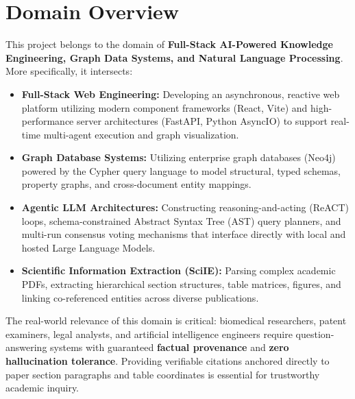 \section{Domain Overview}
This project belongs to the domain of \textbf{Full-Stack AI-Powered Knowledge Engineering, Graph Data Systems, and Natural Language Processing}. More specifically, it intersects:
\begin{itemize}
    \item \textbf{Full-Stack Web Engineering:} Developing an asynchronous, reactive web platform utilizing modern component frameworks (React, Vite) and high-performance server architectures (FastAPI, Python AsyncIO) to support real-time multi-agent execution and graph visualization.
    \item \textbf{Graph Database Systems:} Utilizing enterprise graph databases (Neo4j) powered by the Cypher query language to model structural, typed schemas, property graphs, and cross-document entity mappings.
    \item \textbf{Agentic LLM Architectures:} Constructing reasoning-and-acting (ReACT) loops, schema-constrained Abstract Syntax Tree (AST) query planners, and multi-run consensus voting mechanisms that interface directly with local and hosted Large Language Models.
    \item \textbf{Scientific Information Extraction (SciIE):} Parsing complex academic PDFs, extracting hierarchical section structures, table matrices, figures, and linking co-referenced entities across diverse publications.
\end{itemize}

The real-world relevance of this domain is critical: biomedical researchers, patent examiners, legal analysts, and artificial intelligence engineers require question-answering systems with guaranteed \textbf{factual provenance} and \textbf{zero hallucination tolerance}. Providing verifiable citations anchored directly to paper section paragraphs and table coordinates is essential for trustworthy academic inquiry.

